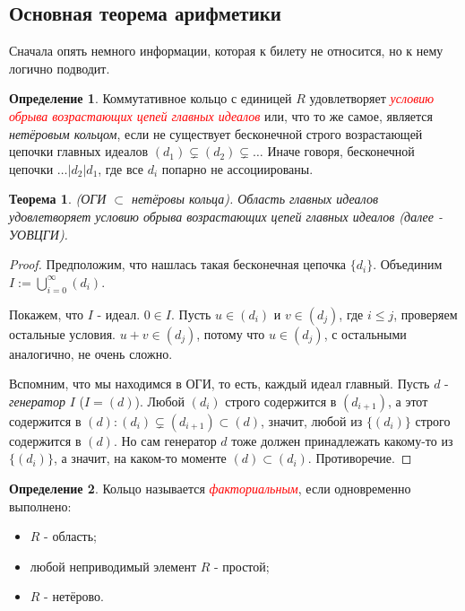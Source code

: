 \documentclass[a4paper,100pt]{article}
\theoremstyle{indented}
\newtheorem{theorem}{Теорема}
\theoremstyle{definition}
\newtheorem{defn}{Определение}
\theoremstyle{remark}
\begin{document}
\resetall

\subsection{Основная теорема арифметики}

Сначала опять немного информации, которая к билету не относится, но к нему логично подводит.\

\begin{defn}
    Коммутативное кольцо с единицей $R$ удовлетворяет \hypertarget{n11}{\textcolor{red}{\textit{условию обрыва возрастающих цепей главных идеалов}}} или, что то же самое, является \textit{нетёровым кольцом}, если не существует бесконечной строго возрастающей цепочки главных идеалов $(d_1)\subsetneq (d_2)\subsetneq \dots$ Иначе говоря, бесконечной цепочки $\dots \vert d_2\vert d_1$, где все $d_i$ попарно не ассоциированы.
\end{defn}

\begin{theorem}
    (ОГИ $\subset$ нетёровы кольца). Область главных идеалов удовлетворяет условию обрыва возрастающих цепей главных идеалов (далее - УОВЦГИ).
\end{theorem}

\begin{proof}
    Предположим, что нашлась такая бесконечная цепочка $\{d_i\}$. Объединим $I:=\bigcup_{i=0}^\infty (d_i)$.\

    Покажем, что $I$ - идеал. $0\in I$. Пусть $u\in (d_i)$ и $v\in (d_j)$, где $i\leq j$, проверяем остальные условия. $u+v\in(d_j)$, потому что $u\in (d_j)$, с остальными аналогично, не очень сложно.\ 

    Вспомним, что мы находимся в ОГИ, то есть, каждый идеал главный. Пусть $d$ - \textit{генератор} $I$ ($I=(d)$). Любой $(d_i)$ строго содержится в $(d_{i+1})$, а этот содержится в $(d):(d_i)\subsetneq (d_{i+1})\subset (d)$, значит, любой из $\{(d_i)\}$ строго содержится в $(d)$. Но сам генератор $d$ тоже должен принадлежать какому-то из $\{(d_i)\}$, а значит, на каком-то моменте $(d)\subset (d_i)$. Противоречие.
\end{proof}

\begin{defn}
    Кольцо называется \hypertarget{n12}{\textcolor{red}{\textit{факториальным}}}, если одновременно выполнено:
    \begin{itemize}
        \item $R$ - область;
        \item любой неприводимый элемент $R$ - простой;
        \item $R$ - нетёрово.
    \end{itemize}
\end{defn}
\end{document}
